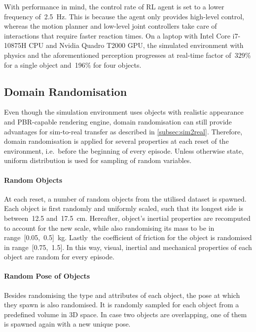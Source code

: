 \bigskip

With performance in mind, the control rate of RL agent is set to a lower frequency of~2.5~Hz. This is because the agent only provides high-level control, whereas the motion planner and low-level joint controllers take care of interactions that require faster reaction times. On a laptop with Intel Core i7-10875H CPU and Nvidia Quadro T2000 GPU, the simulated environment with physics and the aforementioned perception progresses at real-time factor of~329\% for a single object and~196\% for four objects.

\subsection{Domain Randomisation}\label{sec:impl_domain_randomisation}

Even though the simulation environment uses objects with realistic appearance and PBR-capable rendering engine, domain randomisation can still provide advantages for sim-to-real transfer as described in \autoref{subsec:sim2real}. Therefore, domain randomisation is applied for several properties at each reset of the environment, i.e.~before the beginning of every episode. Unless otherwise state, uniform distribution is used for sampling of random variables.

\paragraph{Random Objects} At each reset, a number of random objects from the utilised dataset is spawned. Each object is first randomly and uniformly scaled, such that its longest side is between~12.5 and~17.5~cm. Hereafter, object's inertial properties are recomputed to account for the new scale, while also randomising its mass to be in range~[0.05,~0.5]~kg. Lastly~the coefficient of friction for the object is randomised in range~[0.75,~1.5]. In this way, visual, inertial and mechanical properties of each object are random for every episode.

\paragraph{Random Pose of Objects} Besides randomising the type and attributes of each object, the pose at which they spawn is also randomised. It is randomly sampled for each object from a predefined volume in 3D space. In case two objects are overlapping, one of them is spawned again with a new unique pose.

